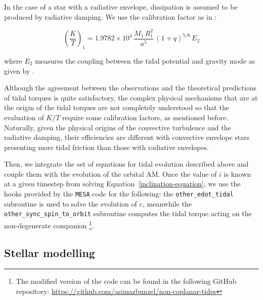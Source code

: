 \documentclass{aa}
\begin{document}
In the case of a star with a radiative envelope, dissipation is assumed to be produced by radiative damping. We use the calibration factor
as in \citet{hurley2002}:

\begin{equation}
   \left( \dfrac{K}{T} \right)_1 = 1.9782 \times 10^4 \, \dfrac{M_1 \, R_1^2}{a^5} \, (1+q)^{5/6} \, E_2
\end{equation}

{\noindent where $E_2$ measures the coupling between the tidal potential and gravity mode as given by \citet{zahn1975}.}

Although the agreement between the observations and the theoretical predictions of tidal torques is quite satisfactory, the complex
physical mechanisms that are at the origin of the tidal torques are not completely understood so that the evaluation of $K/T$ require some
calibration factors, as mentioned before. Naturally, given the physical origins of the convective turbulence and the radiative damping,
their efficiencies are different with convective envelope stars presenting more tidal friction than those with radiative envelopes.

Then, we integrate the set of equations for tidal evolution described above and couple them with the evolution of the orbital AM. Once the
value of $i$ is known at a given timestep from solving Equation~\ref{inclination-equation}, we use the hooks provided by the {\tt MESA}
code for the following: the {\tt other\_edot\_tidal} subroutine is used to solve the evolution of $e$, meanwhile the
{\tt other\_sync\_spin\_to\_orbit} subroutine computes the tidal torque acting on the non-degenerate companion \footnote{The modified
version of the code can be found in the following GitHub repository: \url{https://github.com/asimazbunzel/non-coplanar-tides}}.

\subsection{Stellar modelling}
\label{subsection:stellar-model}
\end{document}
